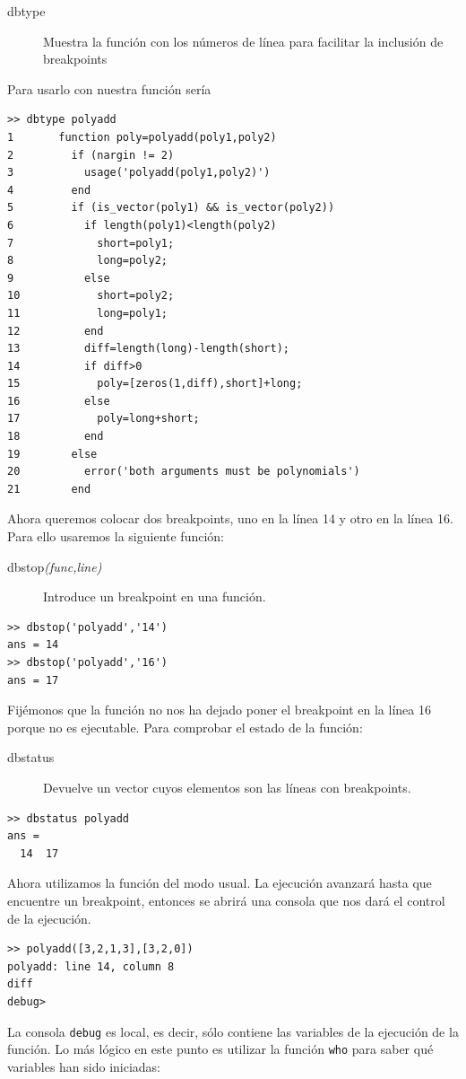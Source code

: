 \begin{description}
\item [dbtype]Muestra la función con los números de
  línea para facilitar la inclusión de breakpoints
\end{description}
Para usarlo con nuestra función sería

  \begin{verbatim}
>> dbtype polyadd
1       function poly=polyadd(poly1,poly2)
2         if (nargin != 2)
3           usage('polyadd(poly1,poly2)')
4         end
5         if (is_vector(poly1) && is_vector(poly2))
6           if length(poly1)<length(poly2)
7             short=poly1;
8             long=poly2;
9           else
10            short=poly2;
11            long=poly1;
12          end
13          diff=length(long)-length(short);
14          if diff>0
15            poly=[zeros(1,diff),short]+long;
16          else
17            poly=long+short;
18          end
19        else
20          error('both arguments must be polynomials')
21        end
\end{verbatim}
Ahora queremos colocar dos breakpoints, uno en la línea 14 y otro en
la línea 16. Para ello usaremos la siguiente función:

\begin{description}
\item [{dbstop\textsl{(func,line)}}]Introduce un
  breakpoint en una función.
\end{description}
\begin{verbatim}
>> dbstop('polyadd','14')
ans = 14
>> dbstop('polyadd','16')
ans = 17
\end{verbatim}
Fijémonos que la función no nos ha dejado poner el breakpoint en la
línea 16 porque no es ejecutable. Para comprobar el estado de la
función:

\begin{description}
\item [dbstatus]Devuelve un vector cuyos elementos son las líneas con
  breakpoints.
\end{description}
\begin{verbatim}
>> dbstatus polyadd
ans =
  14  17
\end{verbatim}
Ahora utilizamos la función del modo usual. La ejecución avanzará
hasta que encuentre un breakpoint, entonces se abrirá una consola que
nos dará el control de la ejecución.

  \begin{verbatim}
>> polyadd([3,2,1,3],[3,2,0])
polyadd: line 14, column 8
diff
debug>
\end{verbatim}
La consola \texttt{debug} es local, es decir, sólo contiene las
variables de la ejecución de la función. Lo más lógico en este punto
es utilizar la función \texttt{who} para saber qué variables han sido
iniciadas:


